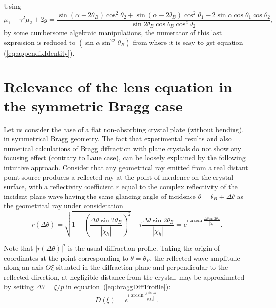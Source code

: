 \documentclass[preprint]{iucr}              %
\newcommand{\inred}[1]{{\color{red}#1}}
\begin{document}
Using
\inred{
\begin{equation}
    \mu_1 + \gamma^2 \mu_2 + 2 g = \frac{
    \sin(\alpha+2 \theta_B)\cos^2\theta_2 + \sin(\alpha-2\theta_B) \cos^2\theta_1 - 2 \sin\alpha \cos\theta_1 \cos\theta_2
    }{
    \sin2\theta_B \cos\theta_B \cos^2\theta_2
    },
\end{equation}
by some cumbersome algebraic manipulations, the numerator of this last expression is reduced to $(\sin\alpha \sin^22\theta_B)$ from where it is easy to get equation (\ref{eq:appendixIdentity}).
}

\section{Relevance of the lens equation in the symmetric Bragg case}
\label{sec:BraggGeometry}

Let us consider the case of a flat non-absorbing crystal plate (without bending), in symmetrical Bragg geometry. The fact that experimental results and also numerical calculations \cite{Honkanen2018} of Bragg diffraction with plane crystals do not show any focusing effect (contrary to Laue case), can be loosely explained by the following intuitive approach. Consider that any geometrical ray emitted from a real distant point-source produces a reflected ray at the point of incidence on the crystal surface, with a reflectivity coefficient \inred{$r$} equal to the complex reflectivity of the incident plane wave having the same glancing angle of incidence $\theta=\theta_B+\Delta\theta$ as the geometrical ray under consideration
\begin{equation}
\label{eq:braggDiffProfile}
    r(\Delta\theta) = \sqrt{1-\left(\frac{\Delta\theta\sin2\theta_B}{|\chi_h|}\right)^2} + i \frac{\Delta\theta\sin2\theta_B}{|\chi_h|} =
    e^{i \arcsin{\frac{\Delta\theta \sin2\theta_B}{ |\chi_h|}}}.
\end{equation}

Note that $|r(\Delta\theta)|^2$ is the usual diffraction profile. Taking the origin of coordinates at the point corresponding to $\theta=\theta_B$, the reflected wave-amplitude along an axis $O\xi$ situated in the diffraction plane and perpendicular to the reflected direction, at negligible distance from the crystal, may be approximated by setting  $\Delta\theta=\xi/p$ in equation~(\ref{eq:braggDiffProfile}):
\begin{equation}
    D(\xi) = e^{i \arcsin{\frac{\xi \sin2\theta}{p |\chi_h|}}}.
\end{equation}
\end{document}
